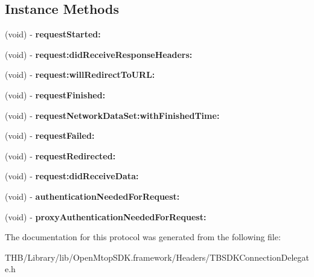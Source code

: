 \subsection*{Instance Methods}
\begin{DoxyCompactItemize}
\item 
\mbox{\label{protocol_t_b_s_d_k_connection_delegate_01-p_afd27ca1e5007926df1ee9d293607c9d1}} 
(void) -\/ {\bfseries request\+Started\+:}
\item 
\mbox{\label{protocol_t_b_s_d_k_connection_delegate_01-p_a93f342c7e192461058a7f98ce19106de}} 
(void) -\/ {\bfseries request\+:did\+Receive\+Response\+Headers\+:}
\item 
\mbox{\label{protocol_t_b_s_d_k_connection_delegate_01-p_afcbfa5258064aca2be4506258c2b0250}} 
(void) -\/ {\bfseries request\+:will\+Redirect\+To\+U\+R\+L\+:}
\item 
\mbox{\label{protocol_t_b_s_d_k_connection_delegate_01-p_a1b765c5009838de00a0d490e90e15c07}} 
(void) -\/ {\bfseries request\+Finished\+:}
\item 
\mbox{\label{protocol_t_b_s_d_k_connection_delegate_01-p_af90082d17647d41dc7b91e364c48a065}} 
(void) -\/ {\bfseries request\+Network\+Data\+Set\+:with\+Finished\+Time\+:}
\item 
\mbox{\label{protocol_t_b_s_d_k_connection_delegate_01-p_a0a3c843a6b92c7374a6e9a1f06804211}} 
(void) -\/ {\bfseries request\+Failed\+:}
\item 
\mbox{\label{protocol_t_b_s_d_k_connection_delegate_01-p_a91bee858156b1715c9bfa24f7a6def7a}} 
(void) -\/ {\bfseries request\+Redirected\+:}
\item 
\mbox{\label{protocol_t_b_s_d_k_connection_delegate_01-p_a358bf78c227e51abf441fe30cbdb4573}} 
(void) -\/ {\bfseries request\+:did\+Receive\+Data\+:}
\item 
\mbox{\label{protocol_t_b_s_d_k_connection_delegate_01-p_af66e3d4f1d64e074c606992cb6227dc5}} 
(void) -\/ {\bfseries authentication\+Needed\+For\+Request\+:}
\item 
\mbox{\label{protocol_t_b_s_d_k_connection_delegate_01-p_af4fab97dc501377d6a67e42f3bd9560c}} 
(void) -\/ {\bfseries proxy\+Authentication\+Needed\+For\+Request\+:}
\end{DoxyCompactItemize}


The documentation for this protocol was generated from the following file\+:\begin{DoxyCompactItemize}
\item 
T\+H\+B/\+Library/lib/\+Open\+Mtop\+S\+D\+K.\+framework/\+Headers/T\+B\+S\+D\+K\+Connection\+Delegate.\+h\end{DoxyCompactItemize}
